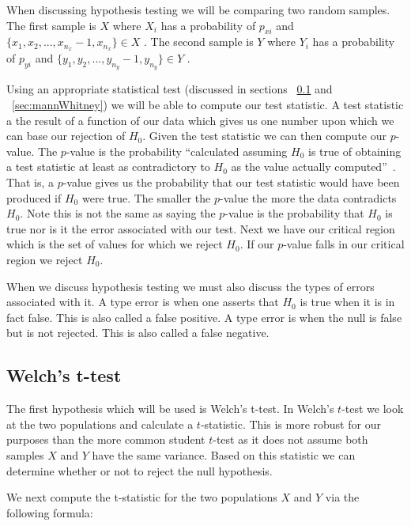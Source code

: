 When discussing hypothesis testing we will be comparing two random samples. The first sample is $X$ where  $X_i$ has a probability of  $p_{xi}$ and $\{x_1,x_2,...,x_{n_x}-1 , x_{n_x}\} \in X$ . The second sample is $Y$ where  $Y_i$ has a probability of  $p_{yi}$ and $\{y_1,y_2,...,y_{n_y}-1 , y_{n_y}\} \in Y$ .


Using an appropriate statistical test (discussed in sections ~\ref{sec:ttest} and ~\ref{sec:mannWhitney}) we will be able to compute our test statistic. A test statistic a the result of a function of our data which gives us one number upon which we can base our rejection of $H_0$. Given the test statistic we can then compute our $p$-value. The $p$-value is the probability ``calculated assuming $H_0$ is true of obtaining a test statistic at least as contradictory to $H_0$ as the value actually computed''~\cite{devore_probability_2011}. That is, a $p$-value gives us the probability that our test statistic would have been produced if $H_0$ were true. The smaller the $p$-value the more the data contradicts $H_0$. Note this is not the same as saying the $p$-value is the probability that $H_0$ is true nor is it the error associated with our test. Next we have our critical region which is the set of values for which we reject $H_0$. If our $p$-value falls in our critical region we reject $H_0$.

When we discuss hypothesis testing we must also discuss the types of errors associated with it. A type  error is when one asserts that $H_0$ is true when it is in fact false. This is also called a false positive. A type  error is when the null is false but is not rejected. This is also called a false negative. 

\subsection{Welch's t-test}\label{sec:ttest}


The first hypothesis which will be used is Welch's t-test\cite{welch_generalization_1947}. In Welch's $t$-test we look at the two populations and calculate a $t$-statistic. This is more robust for our purposes than the more common student $t$-test as it does not assume both samples $X$ and $Y$ have the same variance. Based on this statistic we can determine whether or not to reject the null hypothesis.  

We next compute the t-statistic for the two populations $X$ and $Y$ via the following formula:

